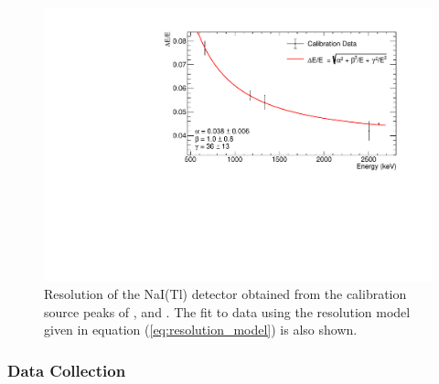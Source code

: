 \begin{figure}[]
    \centering
    \includegraphics[scale=0.75]{Chapter_3/Figures/NaI_resolution.pdf}
    \caption[Resolution of the NaI(Tl) detector obtained from the calibration source peaks of \CoSZ{}, \CsOTS{} and \ThTTE{}.]
    {Resolution of the NaI(Tl) detector obtained from the calibration source peaks of \CoSZ{}, \CsOTS{} and \ThTTE{}. The fit to data using the resolution model given in equation (\ref{eq:resolution_model}) is also shown.}
    \label{fig:detector_resolution_fit}
\end{figure}
%


\subsubsection{Data Collection}
\label{secsec:data_collection}

